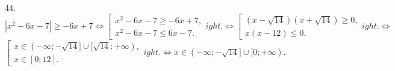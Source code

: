 44. $|x^2-6x-7|\geqslant-6x+7\Leftrightarrow \left[\begin{array}{l}x^2-6x-7\geqslant -6x+7,\\ x^2-6x-7\leqslant 6x-7.\end{array}
ight.
\Leftrightarrow \left[\begin{array}{l}(x-\sqrt{14})(x+\sqrt{14})\geqslant 0,\\ x(x-12)\leqslant 0.\end{array}
ight.
\Leftrightarrow$\\$ \left[\begin{array}{l}x\in(-\infty;-\sqrt{14}]\cup[\sqrt{14};+\infty),\\ x\in[0;12].\end{array}
ight.\Leftrightarrow
x\in(-\infty;-\sqrt{14}]\cup[0;+\infty).$\\
